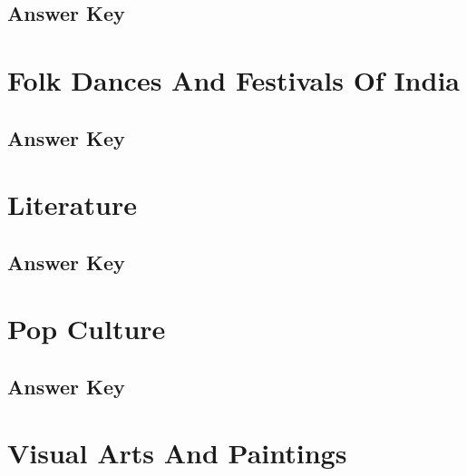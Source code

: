 \documentclass[12pt,a4paper]{book}
\begin{document}


\subsection*{Answer Key}



\section{Folk Dances And Festivals Of India}



\subsection*{Answer Key}



\section{Literature}



\subsection*{Answer Key}



\section{Pop Culture}



\subsection*{Answer Key}



\section{Visual Arts And Paintings}


\end{document}
